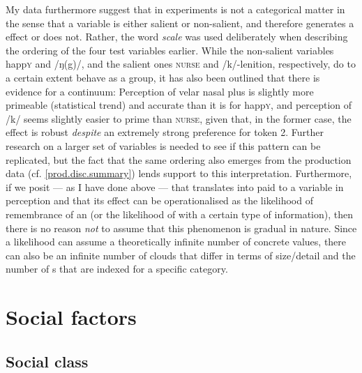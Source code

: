My data furthermore suggest that  in   experiments is not a categorical matter in the sense that a variable is either salient or non-salient, and therefore generates a  effect or does not.
Rather, the word \emph{scale} was used deliberately when describing the ordering of the four test variables earlier.
While the non-salient variables happ\textsc{y} and /ŋ(g)/, and the salient ones \textsc{nurse} and /k/-lenition, respectively, do to a certain extent behave as a group, it has also been outlined that there is evidence for a continuum: Perception of velar nasal plus is slightly more primeable (statistical trend) and accurate than it is for happ\textsc{y}, and perception of /k/ seems slightly easier to prime than \textsc{nurse}, given that, in the former case, the effect is robust \emph{despite} an extremely strong preference for token 2.
Further research on a larger set of variables is needed to see if this pattern can be replicated, but the fact that the same ordering also emerges from the production data (cf. \ref{prod.disc.summary}) lends support to this interpretation.
Furthermore, if we posit --- as I have done above --- that  translates into  paid to a variable in perception and that its effect can be operationalised as the likelihood of remembrance of an  (or the likelihood of  with a certain type of information), then there is no reason \emph{not} to assume that this phenomenon is gradual in nature.
Since a likelihood can assume a theoretically infinite number of concrete values, there can also be an infinite number of  clouds that differ in terms of size/detail and the number of s that are indexed for a specific category.

	\section{Social factors}
		\label{sec.perc_res.disc.social}

		\subsection{Social class}

